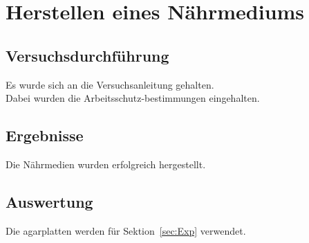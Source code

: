 

\section{Herstellen eines Nährmediums}
\label{sec:Naehrm}
\subsection{Versuchsdurchführung}
\label{sec:Naehrm-V}
Es wurde sich an die Versuchsanleitung gehalten.\\
Dabei wurden die Arbeitsschutz-bestimmungen eingehalten.    
    
    
\subsection{Ergebnisse}
\label{sec:Naehrm-E}

Die Nährmedien wurden erfolgreich hergestellt.


\subsection{Auswertung}
\label{sec:Naehrm-A}

Die agarplatten werden für Sektion~\ref{sec:Exp} verwendet.



